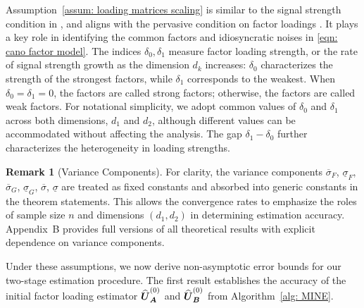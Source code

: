 \documentclass[11pt,letterpaper]{article}
\theoremstyle{definition}
\newtheorem{remark}{Remark}
\begin{document}
Assumption~\ref{assum: loading matrices scaling} is similar to the signal strength condition in \cite{lam2012factor,han2024tensor,chen2026estimation}, and aligns with the pervasive condition on factor loadings \citep{stock2002forecasting, bai2003inferential}. It plays a key role in identifying the common factors
and idiosyncratic noises in \eqref{eqn: cano factor model}. The indices $\delta_0,\delta_1$ measure factor loading strength, or the rate of signal strength growth as the dimension $d_k$ increases: $\delta_0$ characterizes the strength of the strongest factors, while $\delta_1$ corresponds to the weakest. When $\delta_0=\delta_1=0$, the factors are called strong factors; otherwise, the factors are called weak factors. For notational simplicity, we adopt common values of $\delta_0$ and $\delta_1$ across both dimensions, $d_1$ and $d_2$, although different values can be accommodated without affecting the analysis. The gap $\delta_1-\delta_0$ further characterizes the heterogeneity in loading strengths.




\begin{remark}[Variance Components]
For clarity, the variance components $\overline{\sigma}_{F}$, $\underline{\sigma}_{ F}$, $\overline{\sigma}_{G}$, $\underline{\sigma}_{G}$, $\overline{\sigma}$, $\underline{\sigma}$ are treated as fixed constants and absorbed into generic constants in the theorem statements. This allows the convergence rates to emphasize the roles of sample size $n$ and dimensions $(d_1,d_2)$ in determining estimation accuracy. Appendix~B provides full versions of all theoretical results with explicit dependence on variance components.
\end{remark}





Under these assumptions, we now derive non-asymptotic error bounds for our two-stage estimation procedure. The first result establishes the accuracy of the initial factor loading estimator $\widehat{\boldsymbol{U}}_{\boldsymbol{A}}^{(0)}$ and $\widehat{\boldsymbol{U}}_{\boldsymbol{B}}^{(0)}$ from Algorithm~\ref{alg: MINE}.
\end{document}
